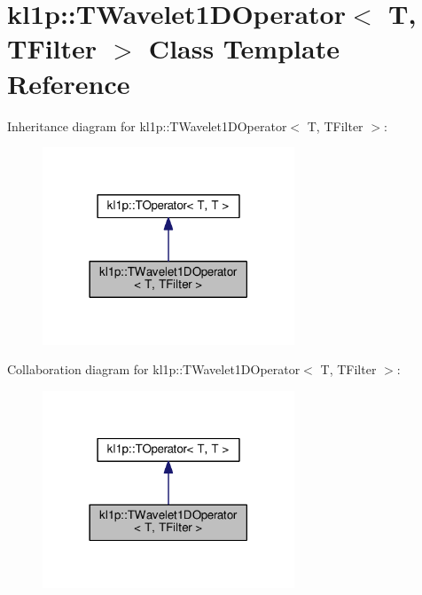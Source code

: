 \hypertarget{classkl1p_1_1TWavelet1DOperator}{}\section{kl1p\+:\+:T\+Wavelet1\+D\+Operator$<$ T, T\+Filter $>$ Class Template Reference}
\label{classkl1p_1_1TWavelet1DOperator}


Inheritance diagram for kl1p\+:\+:T\+Wavelet1\+D\+Operator$<$ T, T\+Filter $>$\+:
\nopagebreak
\begin{figure}[H]
\begin{center}
\leavevmode
\includegraphics[width=213pt]{classkl1p_1_1TWavelet1DOperator__inherit__graph}
\end{center}
\end{figure}


Collaboration diagram for kl1p\+:\+:T\+Wavelet1\+D\+Operator$<$ T, T\+Filter $>$\+:
\nopagebreak
\begin{figure}[H]
\begin{center}
\leavevmode
\includegraphics[width=213pt]{classkl1p_1_1TWavelet1DOperator__coll__graph}
\end{center}
\end{figure}
